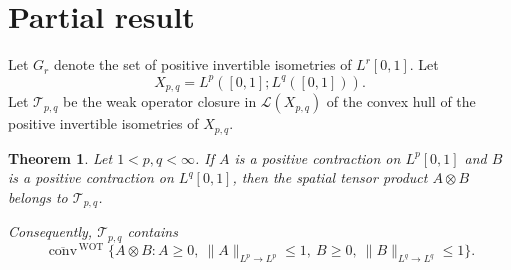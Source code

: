 \documentclass[11pt]{amsart}
\newtheorem{theorem}{Theorem}
\theoremstyle{remark}
\newcommand{\calT}{\mathcal T}
\newcommand{\calL}{\mathcal L}
\newcommand{\conv}{\operatorname{conv}}
\newcommand{\wot}{\operatorname{WOT}}
\begin{document}
\section*{Partial result}

Let $G_r$ denote the set of positive invertible isometries of $L^r[0,1]$.
Let
\[
        X_{p,q}=L^p([0,1];L^q([0,1])).
\]
Let $\calT_{p,q}$ be the weak operator closure in $\calL(X_{p,q})$ of the
convex hull of the positive invertible isometries of $X_{p,q}$.

\begin{theorem}
Let $1<p,q<\infty$.  If $A$ is a positive contraction on $L^p[0,1]$ and $B$
is a positive contraction on $L^q[0,1]$, then the spatial tensor product
$A\otimes B$ belongs to $\calT_{p,q}$.

Consequently, $\calT_{p,q}$ contains
\[
 \overline{\conv}^{\,\wot}\{A\otimes B:
   A\ge 0,\ \|A\|_{L^p\to L^p}\le 1,\ 
   B\ge 0,\ \|B\|_{L^q\to L^q}\le 1\}.
\]
\end{theorem}
\end{document}

